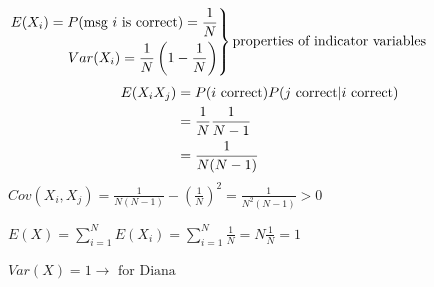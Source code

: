 $
\left.\begin{aligned}
E(X_i)=P(\text{msg $ i $ is correct})=\frac{1}{N}\\
Var(X_i)=\frac{1}{N}\left( 1-\frac{1}{N} \right)
\end{aligned}\right\}\text{properties of indicator variables}
$
\begin{align*}
    E(X_iX_j)
    &=P(\text{$ i $ correct})P(\text{$ j $ correct}|\text{$ i $ correct})\\
    &=\frac{1}{N}\frac{1}{N-1}\\
    &=\frac{1}{N(N-1)}
\end{align*}
$ Cov(X_i,X_j)=\frac{1}{N(N-1)}-\left( \frac{1}{N} \right)^2=
\frac{1}{N^2(N-1)} >0$

$ E(X)=\sum\limits_{i=1}^{N} E(X_i)=\sum\limits_{i=1}^{N}\frac{1}{N}
=N\frac{1}{N}=1 $

$ Var(X)=1\rightarrow\text{ for Diana} $
